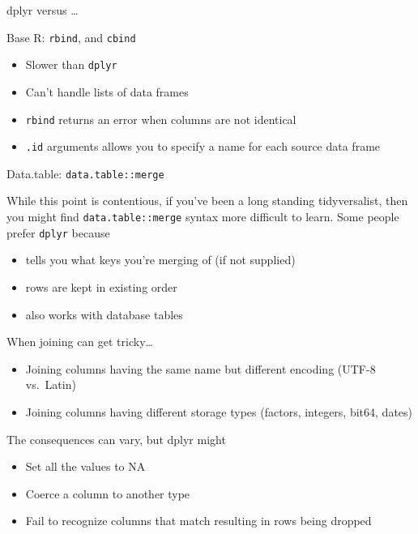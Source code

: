 \documentclass[ignorenonframetext,]{beamer}
\providecommand{\tightlist}{%
  \setlength{\itemsep}{0pt}\setlength{\parskip}{0pt}}
\begin{document}
\begin{frame}[fragile]{dplyr versus \ldots{}}

\begin{block}{Base R: \texttt{rbind}, and \texttt{cbind}}

\begin{itemize}
\tightlist
\item
  Slower than \texttt{dplyr}
\item
  Can't handle lists of data frames
\item
  \texttt{rbind} returns an error when columns are not identical
\item
  \texttt{.id} arguments allows you to specify a name for each source
  data frame
\end{itemize}

\end{block}

\begin{block}{Data.table: \texttt{data.table::merge}}

While this point is contentious, if you've been a long standing
tidyversalist, then you might find \texttt{data.table::merge} syntax
more difficult to learn. Some people prefer \texttt{dplyr} because

\begin{itemize}
\tightlist
\item
  tells you what keys you're merging of (if not supplied)
\item
  rows are kept in existing order
\item
  also works with database tables
\end{itemize}

\end{block}

\end{frame}

\begin{frame}{When joining can get tricky\ldots{}}

\begin{itemize}
\tightlist
\item
  Joining columns having the same name but different encoding (UTF-8
  vs.~Latin)
\item
  Joining columns having different storage types (factors, integers,
  bit64, dates)
\end{itemize}

The consequences can vary, but dplyr might

\begin{itemize}
\tightlist
\item
  Set all the values to NA
\item
  Coerce a column to another type
\item
  Fail to recognize columns that match resulting in rows being dropped
\end{itemize}

\end{frame}
\end{document}
